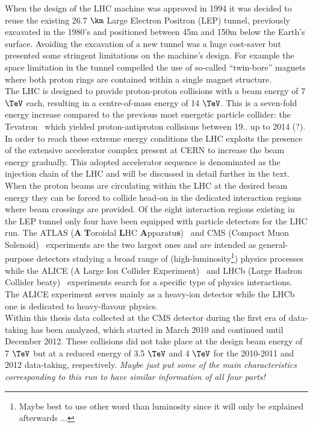 When the design of the LHC machine was approved in 1994 it was decided to reuse the existing 26.7 $\km$ Large Electron Positron (LEP) tunnel, previously excavated in the 1980's and positioned between 45m and 150m below the Earth's surface.
Avoiding the excavation of a new tunnel was a huge cost-saver but presented some stringent limitations on the machine's design. For example the space limitation in the tunnel compelled the use of so-called ``twin-bore'' magnets where both proton rings are contained within a single magnet structure.
\\
The LHC is designed to provide proton-proton collisions with a beam energy of 7 $\TeV$ each, resulting in a centre-of-mass energy of 14 $\TeV$. This is a seven-fold energy increase compared to the previous most energetic particle collider: the Tevatron~\cite{} which yielded proton-antiproton collisions between 19.. up to 2014 (?). In order to reach these extreme energy conditions the LHC exploits the presence of the extensive accelerator complex present at CERN to increase the beam energy gradually. This adopted accelerator sequence is denominated as the injection chain of the LHC and will be discussed in detail further in the text.
\\
When the proton beams are circulating within the LHC at the desired beam energy they can be forced to collide head-on in the dedicated interaction regions where beam crossings are provided. Of the eight interaction regions existing in the LEP tunnel only four have been equipped with particle detectors for the LHC run. The ATLAS (\textbf{A} \textbf{T}oroidal \textbf{L}HC \textbf{A}pparatu\textbf{s})~\cite{} and CMS (Compact Muon Solenoid)~\cite{} experiments are the two largest ones and are intended as general-purpose detectors studying a broad range of (high-luminosity\footnote{Maybe best to use other word than luminosity since it will only be explained afterwards ...}) physics processes while the ALICE (A Large Ion Collider Experiment)~\cite{} and LHCb (Large Hadron Collider beaty)~\cite{} experiments search for a specific type of physics interactions. The ALICE experiment serves mainly as a heavy-ion detector while the LHCb one is dedicated to heavy-flavour physics.
\\
Within this thesis data collected at the CMS detector during the first era of data-taking has been analyzed, which started in March 2010 and continued until December 2012. These collisions did not take place at the design beam energy of 7 $\TeV$ but at a reduced energy of 3.5 $\TeV$ and 4 $\TeV$ for the 2010-2011 and 2012 data-taking, respectively. \textit{Maybe just put some of the main characteristics corresponding to this run to have similar information of all four parts!}

